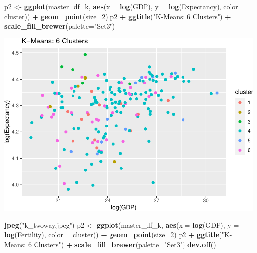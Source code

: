 \documentclass[]{article}
\newenvironment{Shaded}{\begin{snugshade}}{\end{snugshade}}
\newcommand{\DataTypeTok}[1]{\textcolor[rgb]{0.13,0.29,0.53}{#1}}
\newcommand{\DecValTok}[1]{\textcolor[rgb]{0.00,0.00,0.81}{#1}}
\newcommand{\KeywordTok}[1]{\textcolor[rgb]{0.13,0.29,0.53}{\textbf{#1}}}
\newcommand{\NormalTok}[1]{#1}
\newcommand{\OperatorTok}[1]{\textcolor[rgb]{0.81,0.36,0.00}{\textbf{#1}}}
\newcommand{\StringTok}[1]{\textcolor[rgb]{0.31,0.60,0.02}{#1}}
\begin{document}
\begin{Shaded}
\begin{Highlighting}[]
\NormalTok{p2 <-}\StringTok{ }\KeywordTok{ggplot}\NormalTok{(master_df_k, }\KeywordTok{aes}\NormalTok{(}\DataTypeTok{x =} \KeywordTok{log}\NormalTok{(GDP), }\DataTypeTok{y =} \KeywordTok{log}\NormalTok{(Expectancy), }\DataTypeTok{color =}\NormalTok{ cluster)) }\OperatorTok{+}
\StringTok{  }\KeywordTok{geom_point}\NormalTok{(}\DataTypeTok{size=}\DecValTok{2}\NormalTok{)}
\NormalTok{p2 }\OperatorTok{+}\StringTok{ }\KeywordTok{ggtitle}\NormalTok{(}\StringTok{"K-Means: 6 Clusters"}\NormalTok{) }\OperatorTok{+}\StringTok{ }\KeywordTok{scale_fill_brewer}\NormalTok{(}\DataTypeTok{palette=}\StringTok{"Set3"}\NormalTok{)}
\end{Highlighting}
\end{Shaded}

\includegraphics{eda_files/figure-latex/unnamed-chunk-26-2.pdf}

\begin{Shaded}
\begin{Highlighting}[]
\KeywordTok{jpeg}\NormalTok{(}\StringTok{"k_twoway.jpeg"}\NormalTok{)}
\NormalTok{p2 <-}\StringTok{ }\KeywordTok{ggplot}\NormalTok{(master_df_k, }\KeywordTok{aes}\NormalTok{(}\DataTypeTok{x =} \KeywordTok{log}\NormalTok{(GDP), }\DataTypeTok{y =} \KeywordTok{log}\NormalTok{(Fertility), }\DataTypeTok{color =}\NormalTok{ cluster)) }\OperatorTok{+}
\StringTok{  }\KeywordTok{geom_point}\NormalTok{(}\DataTypeTok{size=}\DecValTok{2}\NormalTok{)}
\NormalTok{p2 }\OperatorTok{+}\StringTok{ }\KeywordTok{ggtitle}\NormalTok{(}\StringTok{"K-Means: 6 Clusters"}\NormalTok{) }\OperatorTok{+}\StringTok{ }\KeywordTok{scale_fill_brewer}\NormalTok{(}\DataTypeTok{palette=}\StringTok{"Set3"}\NormalTok{)}
\KeywordTok{dev.off}\NormalTok{()}
\end{Highlighting}
\end{Shaded}
\end{document}

